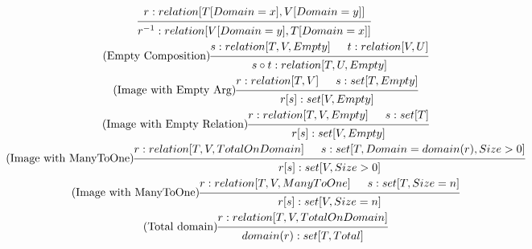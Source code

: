 \documentclass{article}
\begin{document}
\begin{gather}
\begin{prooftree}
        \hypo{r: relation[T[Domain=x], V[Domain=y]]}
        \infer1{r^{-1}: relation[V[Domain=y], T[Domain=x]]}
    \end{prooftree}
    \\
    \tag{Empty Composition}
    \begin{prooftree}
        \hypo{s: relation[T, V, Empty]}
        \hypo{t: relation[V, U]} %
        \infer2{s \circ t: relation[T, U, Empty]}
    \end{prooftree}
    \\
    \tag{Image with Empty Arg}
    \begin{prooftree}
        \hypo{r: relation[T, V]}
        \hypo{s: set[T, Empty]}
        \infer2{r[s]: set[V, Empty]}
    \end{prooftree}
    \\
    \tag{Image with Empty Relation}
    \begin{prooftree}
        \hypo{r: relation[T, V, Empty]}
        \hypo{s: set[T]}
        \infer2{r[s]: set[V, Empty]}
    \end{prooftree}
    \\
    \tag{Image with ManyToOne}
    \begin{prooftree}
        \hypo{r: relation[T, V, TotalOnDomain]}
        \hypo{s: set[T, Domain=domain(r), Size > 0]}
        \infer2{r[s]: set[V, Size > 0]}
    \end{prooftree}
    \\
    \tag{Image with ManyToOne}
    \begin{prooftree}
        \hypo{r: relation[T, V, ManyToOne]}
        \hypo{s: set[T, Size = n]}
        \infer2{r[s]: set[V, Size = n]}
    \end{prooftree}
    \\
    \tag{Total domain}
    \begin{prooftree}
        \hypo{r: relation[T, V, TotalOnDomain]}
        \infer1{domain(r): set[T, Total]}
    \end{prooftree}
    \\

\end{gather}
\end{document}
